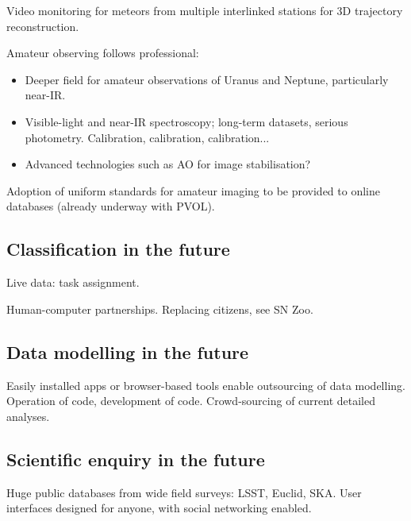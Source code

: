 \documentclass{ar2e}
\begin{document}
Video monitoring for meteors from multiple interlinked stations for 3D
trajectory reconstruction.

Amateur observing follows professional:
\begin{itemize}
\item Deeper field for amateur observations of Uranus and Neptune, particularly
near-IR.
\item Visible-light and near-IR spectroscopy; long-term datasets, serious
photometry.  Calibration, calibration, calibration...
\item Advanced technologies such as AO for image stabilisation?
\end{itemize}

Adoption of uniform standards for amateur imaging to be provided to online
databases (already underway with PVOL).




\subsection{Classification in the future}
\label{sec:future:class}

Live data: task assignment. 

Human-computer partnerships. Replacing citizens, see SN Zoo.



\subsection{Data modelling in the future}
\label{sec:future:models}

Easily installed apps or browser-based tools enable outsourcing of data
modelling. Operation of code, development of code. Crowd-sourcing of current
detailed analyses.



\subsection{Scientific enquiry in the future}
\label{sec:future:enquiry}

Huge public databases from wide field surveys: LSST, Euclid, SKA. User
interfaces designed for anyone, with social networking enabled. 
\end{document}
